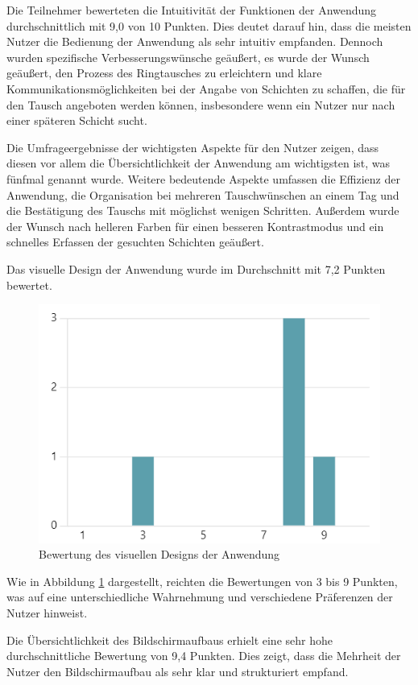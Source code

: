 Die Teilnehmer bewerteten die Intuitivität der Funktionen der Anwendung durchschnittlich mit 9,0 von 10 Punkten. Dies deutet darauf hin, dass die meisten Nutzer die Bedienung der Anwendung als sehr intuitiv empfanden. Dennoch wurden spezifische Verbesserungswünsche geäußert, es wurde der Wunsch geäußert, den Prozess des Ringtausches zu erleichtern und klare Kommunikationsmöglichkeiten bei der Angabe von Schichten zu schaffen, die für den Tausch angeboten werden können, insbesondere wenn ein Nutzer nur nach einer späteren Schicht sucht.

Die Umfrageergebnisse der wichtigsten Aspekte für den Nutzer zeigen, dass diesen vor allem die Übersichtlichkeit der Anwendung am wichtigsten ist, was fünfmal genannt wurde. Weitere bedeutende Aspekte umfassen die Effizienz der Anwendung, die Organisation bei mehreren Tauschwünschen an einem Tag und die Bestätigung des Tauschs mit möglichst wenigen Schritten. Außerdem wurde der Wunsch nach helleren Farben für einen besseren Kontrastmodus und ein schnelles Erfassen der gesuchten Schichten geäußert.

Das visuelle Design der Anwendung wurde im Durchschnitt mit 7,2 Punkten bewertet. 

\begin{figure}[h]
    \centering
    \includegraphics[clip,width=0.75\linewidth]{images/Grafik_Umfrage_visuelles_Design.png}
    \caption[Bewertung des visuellen Designs der Anwendung]{Bewertung des visuellen Designs der Anwendung}
    \label{Grafik}
\end{figure}

Wie in Abbildung \ref{Grafik} dargestellt, reichten die Bewertungen von 3 bis 9 Punkten, was auf eine unterschiedliche Wahrnehmung und verschiedene Präferenzen der Nutzer hinweist.

Die Übersichtlichkeit des Bildschirmaufbaus erhielt eine sehr hohe durchschnittliche Bewertung von 9,4 Punkten. Dies zeigt, dass die Mehrheit der Nutzer den Bildschirmaufbau als sehr klar und strukturiert empfand.

